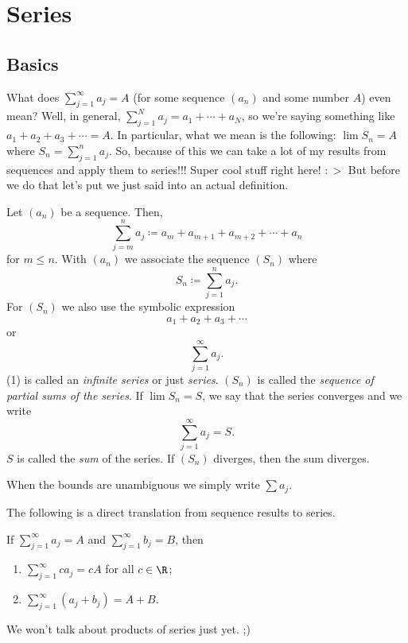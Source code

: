 \documentclass[class=article, crop=false]{standalone}
\begin{document}
\section{Series}

\subsection{Basics}

What does $\sum_{j=1}^{\infty} a_j = A$ (for some sequence $(a_n)$ and some number $A$) even mean? Well, in general, $\sum_{j=1}^{N} a_j = a_1 + \cdots + a_N$, so we're saying something like $a_1+ a_2 + a_3 + \cdots = A$. In particular, what we mean is the following: $\lim S_n = A$ where $S_n = \sum_{j=1}^{n} a_j$. So, because of this we can take a lot of my results from sequences and apply them to series!!! Super cool stuff right here! $:>$ But before we do that let's put we just said into an actual definition.
\begin{defn}
    Let $(a_n)$ be a sequence. Then,
        \[
            \sum_{j=m}^{n} a_j \coloneqq a_m + a_{m+1} + a_{m+2} + \cdots + a_n
        \]
    for $m \leq n$. With $(a_n)$ we associate the sequence $(S_n)$ where
        \[
            S_n \coloneqq \sum_{j=1}^{n} a_j.
        \]
    For $(S_n)$ we also use the symbolic expression
        \[
            a_1 + a_2 + a_3 + \cdots
        \]
    or
        \[
            \sum_{j=1}^{\infty} a_j. \tag{1}
        \]
    (1) is called an \textit{infinite series} or just \textit{series}. $(S_n)$ is called the \textit{sequence of partial sums of the series}. If $\lim S_n = S$, we say that the series converges and we write
        \[
            \sum_{j=1}^{\infty} a_j = S.
        \]
    $S$ is called the \textit{sum} of the series. If $(S_n)$ diverges, then the sum diverges.

    When the bounds are unambiguous we simply write $\sum a_j$.
\end{defn}

The following is a direct translation from sequence results to series.
\begin{thm}
    If $\sum_{j=1}^{\infty} a_j = A$ and $\sum_{j=1}^{\infty} b_j = B$, then
        \begin{enumerate}[\normalfont(i)]
            \item $\sum_{j=1}^{\infty} ca_j = cA$ for all $c \in \R$;
            \item $\sum_{j=1}^{\infty} (a_j+b_j) = A+B$.
        \end{enumerate}
\end{thm}
\begin{rem}
    We won't talk about products of series just yet. ;)
\end{rem}
\end{document}

